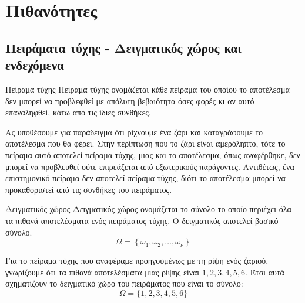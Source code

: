 \section{Πιθανότητες}
\subsection{Πειράματα τύχης - Δειγματικός χώρος και ενδεχόμενα}

\begin{orismos}{Πείραμα τύχης}
Πείραμα τύχης ονομάζεται κάθε πείραμα του οποίου το αποτέλεσμα δεν μπορεί να προβλεφθεί με απόλυτη βεβαιότητα όσες φορές κι αν αυτό επαναληφθεί, κάτω από τις ίδιες συνθήκες.
\end{orismos}
Ας υποθέσουμε για παράδειγμα ότι ρίχνουμε ένα ζάρι και καταγράφουμε το αποτέλεσμα που θα φέρει. Στην περίπτωση που το ζάρι είναι αμερόληπτο, τότε το πείραμα αυτό αποτελεί πείραμα τύχης, μιας και το αποτέλεσμα, όπως αναφέρθηκε, δεν μπορεί να προβλευθεί ούτε επιρεάζεται από εξωτερικούς παράγοντες. Αντιθέτως, ένα επιστημονικό πείραμα δεν αποτελεί πείραμα τύχης, διότι το αποτέλεσμα μπορεί να προκαθοριστεί από τις συνθήκες του πειράματος.
\begin{orismos}{Δειγματικός χώρος}
Δειγματικός χώρος ονομάζεται το σύνολο το οποίο περιέχει όλα τα πιθανά αποτελέσματα ενός πειράματος τύχης. Ο δειγματικός αποτελεί βασικό σύνολο. \[ \varOmega=\left\lbrace \omega_1,\omega_2,\ldots,\omega_\nu \right\rbrace \]
\end{orismos}
Για το πείραμα τύχης που αναφέραμε προηγουμένως με τη ρίψη ενός ζαριού, γνωρίζουμε ότι τα πιθανά αποτελέσματα μιας ρίψης είναι $ 1,2,3,4,5,6 $. Έτσι αυτά σχηματίζουν το δειγματικό χώρο του πειράματος που είναι το σύνολο:
\[ \varOmega=\{1,2,3,4,5,6\} \]
